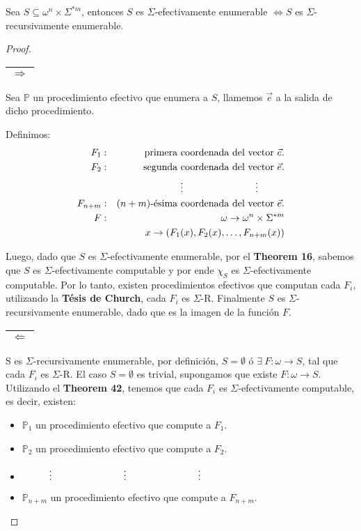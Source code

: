   \begin{theorem}
    \PN Sea $S \subseteq \omega^{n} \times \Sigma^{\ast m}$, entonces $S$ es $\Sigma$-efectivamente enumerable
    $\Leftrightarrow S$ es $\Sigma$-recursivamente enumerable.
  \end{theorem}
  \begin{proof}
    \begin{tabular}{|c|} \hline $\Rightarrow$ \\\hline \end{tabular}
    \PN Sea $\mathbb{P}$ un procedimiento efectivo que enumera a $S$, llamemos $\vec{e}$  a la salida de dicho
    procedimiento.

    \PN Definimos:
    \begin{eqnarray*}
      F_{1} &:& \text{primera coordenada del vector } \vec{e}. \\
      F_{2} &:& \text{segunda coordenada del vector } \vec{e}. \\
      && \vdotswithin{(n-1)m+1} \qquad \vdotswithin{(n-1)m+2} \\
      F_{n+m} &:& (n+m)\text{-ésima coordenada del vector } \vec{e}. \\
      F &:& \omega \rightarrow \omega^{n} \times \Sigma^{\ast m} \\
        && x \rightarrow \left(F_{1}(x), F_{2}(x), \dotsc, F_{n+m}(x)\right)
    \end{eqnarray*}

    \PN Luego, dado que $S$ es $\Sigma$-efectivamente enumerable, por el \textbf{Theorem 16}, sabemos que $S$ es
    $\Sigma$-efectivamente computable y por ende $\chi_{S}$ es $\Sigma$-efectivamente computable. Por lo tanto, existen
    procedimientos efectivos que computan cada $F_{i}$, utilizando la \textbf{Tésis de Church}, cada $F_{i}$ es
    $\Sigma$-R. Finalmente $S$ es $\Sigma$-recursivamente enumerable, dado que es la imagen de la función $F$.

    \vspace{3mm}
    \PN \begin{tabular}{|c|} \hline $\Leftarrow$ \\\hline \end{tabular}
    \vspace{2mm}
    \PN S es $\Sigma$-recursivamente enumerable, por definición, $S = \emptyset$ ó $\exists \ F: \omega \rightarrow S$,
    tal que cada $F_{i}$ es $\Sigma$-R. El caso $S = \emptyset$ es trivial, supongamos que existe $F: \omega \rightarrow
    S$. Utilizando el \textbf{Theorem 42}, tenemos que cada $F_{i}$ es $\Sigma$-efectivamente computable, es decir,
    existen:
    \begin{itemize}
      \item $\mathbb{P}_{1}$ un procedimiento efectivo que compute a $F_{1}$.
      \item $\mathbb{P}_{2}$ un procedimiento efectivo que compute a $F_{2}$.
      \item $\vdotswithin{(n-1)m+1} \qquad \vdotswithin{(n-1)m+2} \qquad \vdotswithin{(n-1)m+r}$
      \item $\mathbb{P}_{n+m}$ un procedimiento efectivo que compute a $F_{n+m}$.
    \end{itemize}


\end{proof}
